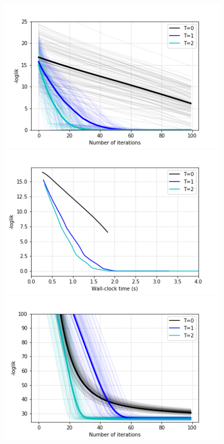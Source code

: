 \begin{figure}[!htb]
  \includegraphics[width=\linewidth]{img/hmm_results.png}
\endminipage
{}
  \includegraphics[width=\linewidth]{img/hmm_times.png}
\endminipage\hfill
{}%
  \includegraphics[width=\linewidth]{img/dlm_results.png}

\end{figure}
